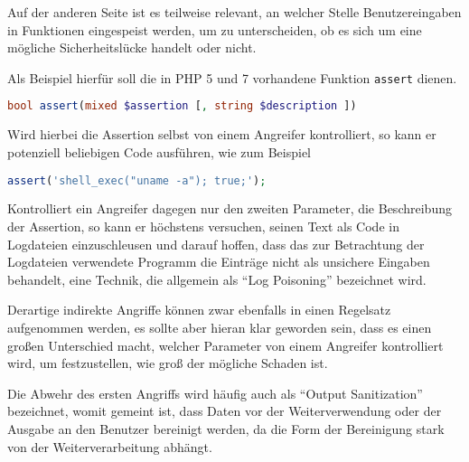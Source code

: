                 Auf der anderen Seite ist es teilweise relevant,
                an welcher Stelle Benutzereingaben in Funktionen eingespeist werden,
                um zu unterscheiden,
                ob es sich um eine mögliche Sicherheitslücke handelt oder
                nicht.

                Als Beispiel hierfür soll die in
                \gls{PHP} 5 und
                7 vorhandene Funktion
                \lstinline{assert} dienen.\cite{PHPGroup2018}

                \begin{lstlisting}[caption={Prototyp der \lstinline{assert}-Funktion in PHP 5 und 7}, gobble=20, language=php]
                    bool assert(mixed $assertion [, string $description ])
                \end{lstlisting}

                Wird hierbei die Assertion selbst von einem Angreifer kontrolliert,
                so kann er potenziell beliebigen Code ausführen,
                wie zum Beispiel

                \begin{lstlisting}[caption={Code Execution durch Assertion}, gobble=20, language=php]
                    assert('shell_exec("uname -a"); true;');
                \end{lstlisting}

                Kontrolliert ein Angreifer dagegen nur den zweiten Parameter,
                die Beschreibung der Assertion,
                so kann er höchstens versuchen,
                seinen Text als Code in Logdateien einzuschleusen und
                darauf hoffen,
                dass das zur Betrachtung der Logdateien verwendete Programm die Einträge nicht als unsichere Eingaben behandelt,
                eine Technik,
                die allgemein als
                \foreignquote{english}{Log Poisoning} bezeichnet wird.\cite{Chandel2017}

                Derartige indirekte Angriffe können zwar ebenfalls in einen Regelsatz aufgenommen werden,
                es sollte aber hieran klar geworden sein,
                dass es einen großen Unterschied macht,
                welcher Parameter von einem Angreifer kontrolliert wird,
                um festzustellen,
                wie groß der mögliche Schaden ist.

                Die Abwehr des ersten Angriffs wird häufig auch als
                \foreignquote{english}{Output Sanitization} bezeichnet,
                womit gemeint ist,
                dass Daten vor der Weiterverwendung oder
                der Ausgabe an den Benutzer bereinigt werden,
                da die Form der Bereinigung stark von der Weiterverarbeitung abhängt.\cite{Seacord2015}

